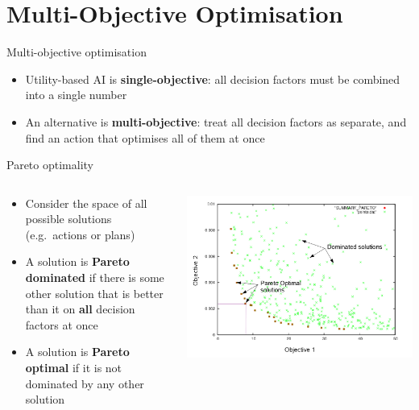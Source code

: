 \part{Multi-Objective Optimisation}
\frame{\partpage}

\begin{frame}{Multi-objective optimisation}
    \begin{itemize}
        \pause\item Utility-based AI is \textbf{single-objective}:
            all decision factors must be combined into a single number
        \pause\item An alternative is \textbf{multi-objective}:
            treat all decision factors as separate, and find an action that optimises all of them at once
    \end{itemize}
\end{frame}

\begin{frame}{Pareto optimality}
    \begin{columns}
        \begin{column}{0.5\textwidth}
            \begin{itemize}
                \pause\item Consider the space of all possible solutions (e.g.\ actions or plans)
                \pause\item A solution is \textbf{Pareto dominated} if there is some other solution
                    that is better than it on \textbf{all} decision factors at once
                \pause\item A solution is \textbf{Pareto optimal} if it is not dominated by any other solution
            \end{itemize}
        \end{column}
        \begin{column}{0.45\textwidth}
            \includegraphics[width=\textwidth]{pareto}
        \end{column}
    \end{columns}
\end{frame}

